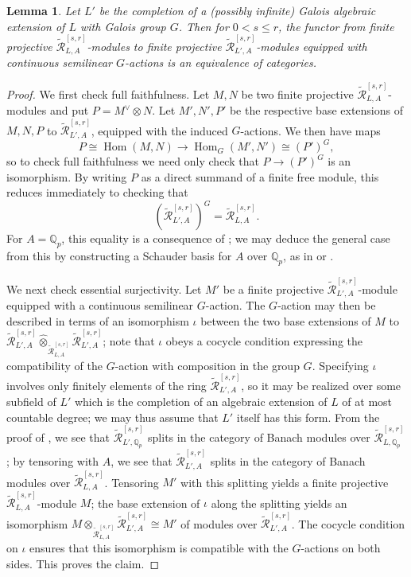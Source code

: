 \documentclass[12pt]{amsart}
\newtheorem{lemma}[theorem]{Lemma}
\theoremstyle{definition}
\numberwithin{equation}{theorem}
\newcommand{\QQ}{\mathbb{Q}}
\newcommand{\calR}{\mathcal{R}}
\newcommand{\dual}{\vee}
\DeclareMathOperator{\Hom}{Hom}
\begin{document}
\begin{lemma} \label{L:Witt module descend}
Let $L'$ be the completion of a (possibly infinite) Galois algebraic extension of $L$ with Galois group $G$. Then for $0 < s \leq r$, the functor from finite projective $\tilde{\calR}^{[s,r]}_{L,A}$-modules to finite projective
$\tilde{\calR}^{[s,r]}_{L',A}$-modules equipped with continuous semilinear $G$-actions is an equivalence of categories.
\end{lemma}
\begin{proof}
We first check full faithfulness.
Let $M,N$ be two finite projective $\tilde{\calR}^{[s,r]}_{L,A}$-modules
and put $P = M^\dual \otimes N$. Let $M',N',P'$ be the respective base extensions of $M,N,P$ to $\tilde{\calR}^{[s,r]}_{L',A}$, equipped with the induced $G$-actions. 
We then have maps
\[
P \cong \Hom(M,N) \to \Hom_G(M',N') \cong (P')^G,
\]
so to check full faithfulness we need only check that $P \to (P')^G$ is an isomorphism.
By writing $P$ as a direct summand of a finite free module, this reduces immediately to checking that 
\[
(\tilde{\calR}^{[s,r]}_{L',A})^G = \tilde{\calR}^{[s,r]}_{L,A}.
\]
For $A = \QQ_p$, this equality is a consequence of \cite[Theorem~9.2.15]{kedlaya-liu1};
we may deduce the general case from this by constructing a Schauder basis for $A$ over $\QQ_p$, as in \cite[Proposition~2.7.2/3]{bgr} or \cite[Lemma~2.2.9(b)]{kedlaya-liu1}.

We next check essential surjectivity.
Let $M'$ be a finite projective $\tilde{\calR}^{[s,r]}_{L',A}$-module equipped with a continuous semilinear $G$-action. The $G$-action may then be described in terms of an isomorphism $\iota$ between the two base extensions of $M$ to $\tilde{\calR}^{[s,r]}_{L',A} \widehat{\otimes}_{\tilde{\calR}^{[s,r]}_{L,A}} \tilde{\calR}^{[s,r]}_{L',A}$;
note that $\iota$ obeys a cocycle condition expressing the compatibility of the $G$-action with composition in the group $G$. Specifying $\iota$ involves only finitely elements of the ring $\tilde{\calR}^{[s,r]}_{L',A}$, so it may be realized over some subfield of $L'$ which is the completion of an algebraic extension of $L$ of at most countable degree; we may thus assume that $L'$ itself has this form. From the proof of \cite[Theorem~9.2.15]{kedlaya-liu1}, we see that $\tilde{\calR}^{[s,r]}_{L',\QQ_p}$ splits in the category of Banach modules over $\tilde{\calR}^{[s,r]}_{L,\QQ_p}$; by tensoring with $A$, we see that
$\tilde{\calR}^{[s,r]}_{L',A}$ splits in the category of Banach modules over $\tilde{\calR}^{[s,r]}_{L,A}$.
Tensoring $M'$ with this splitting yields a finite projective $\tilde{\calR}^{[s,r]}_{L,A}$-module $M$; the base extension of $\iota$ along the splitting yields an isomorphism
$M \otimes_{\tilde{\calR}^{[s,r]}_{L,A}} \tilde{\calR}^{[s,r]}_{L',A} \cong M'$
of modules over $\tilde{\calR}^{[s,r]}_{L',A}$. The cocycle condition on $\iota$ ensures that this isomorphism is compatible with the $G$-actions on both sides.
This proves the claim.
\end{proof}
\end{document}
